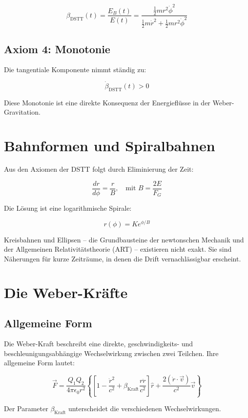 \[
\beta_{\text{DSTT}}(t) = \frac{E_B(t)}{E(t)} = \frac{\frac{1}{2}mr^2\dot{\phi}^2}{\frac{1}{2}m\dot{r}^2 + \frac{1}{2}mr^2\dot{\phi}^2}
\]

\subsection{Axiom 4: Monotonie}
\label{sub:dstt_axiom4}

Die tangentiale Komponente nimmt ständig zu:

\[
\dot{\beta}_{\text{DSTT}}(t) > 0
\]

Diese Monotonie ist eine direkte Konsequenz der Energieflüsse in der Weber-Gravitation.

\section{Bahnformen und Spiralbahnen}
\label{sec:dstt_bahnen}

Aus den Axiomen der DSTT folgt durch Eliminierung der Zeit:

\[
\frac{dr}{d\phi} = \frac{r}{B}, \quad \text{mit } B = \frac{2E}{F_G}
\]

Die Lösung ist eine logarithmische Spirale:

\[
r(\phi) = Ke^{\phi/B}
\]

Kreisbahnen und Ellipsen – die Grundbausteine der newtonschen Mechanik und der Allgemeinen Relativitätstheorie (ART) – existieren nicht exakt. Sie sind Näherungen für kurze Zeiträume, in denen die Drift vernachlässigbar erscheint.

\section{Die Weber-Kräfte}
\label{sec:weber_kraefte}

\subsection{Allgemeine Form}
\label{sub:weber_allgemein}

Die Weber-Kraft beschreibt eine direkte, geschwindigkeits- und beschleunigungsabhängige Wechselwirkung zwischen zwei Teilchen. Ihre allgemeine Form lautet:

\[
\vec{F} = \frac{Q_1 Q_2}{4\pi\epsilon_0 r^2} \left\{ \left[ 1 - \frac{\dot{r}^2}{c^2} + \beta_{\text{Kraft}} \frac{r\ddot{r}}{c^2} \right] \hat{r} + \frac{2(\dot{r} \cdot \vec{v})}{c^2} \vec{v} \right\}
\]

Der Parameter \(\beta_{\text{Kraft}}\) unterscheidet die verschiedenen Wechselwirkungen.


